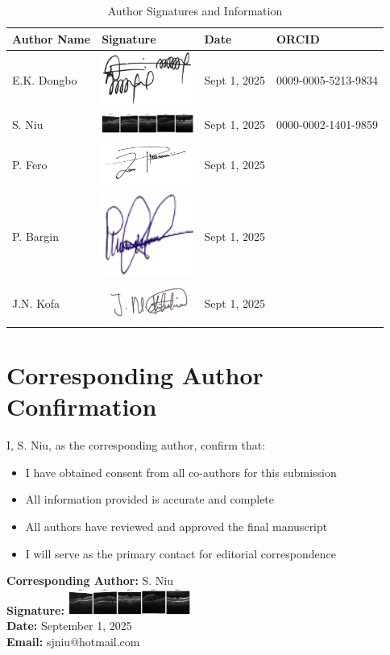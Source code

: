 \documentclass[12pt]{article}
\begin{document}
\begin{table}[h!]
\centering
\begin{tabular}{p{4cm}p{4cm}p{3cm}p{3cm}}
\toprule
\textbf{Author Name} & \textbf{Signature} & \textbf{Date} & \textbf{ORCID} \\
\midrule
E.K. Dongbo & \includegraphics[width=3cm]{fig/author/e.k.dongbo.png} & Sept 1, 2025 & 0009-0005-5213-9834 \\
\midrule
S. Niu & \includegraphics[width=3cm]{fig/author/s.niu.png} & Sept 1, 2025 & 0000-0002-1401-9859 \\
\midrule
P. Fero & \includegraphics[width=3cm]{fig/author/p.fero.png} & Sept 1, 2025 & \\
\midrule
P. Bargin & \includegraphics[width=3cm]{fig/author/p.bargin.png} & Sept 1, 2025 & \\
\midrule
J.N. Kofa & \includegraphics[width=3cm]{fig/author/j.n.kofa.png} & Sept 1, 2025 & \\
\bottomrule
\end{tabular}
\caption{Author Signatures and Information}
\end{table}

\section*{Corresponding Author Confirmation}
I, S. Niu, as the corresponding author, confirm that:
\begin{itemize}
    \item I have obtained consent from all co-authors for this submission
    \item All information provided is accurate and complete
    \item All authors have reviewed and approved the final manuscript
    \item I will serve as the primary contact for editorial correspondence
\end{itemize}

\vspace{1cm}
\noindent\textbf{Corresponding Author:} S. Niu \\
\textbf{Signature:} \includegraphics[width=4cm]{fig/author/s.niu.png} \\
\textbf{Date:} September 1, 2025 \\
\textbf{Email:} sjniu@hotmail.com
\end{document}
